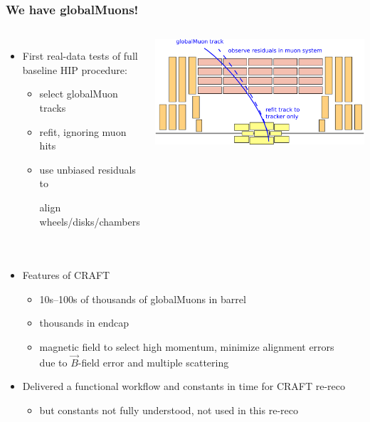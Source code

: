 \documentclass[compress]{beamer}
\begin{document}
\begin{frame}
\frametitle{We have globalMuons!}

\begin{columns}
\begin{itemize}
\item First real-data tests of full baseline HIP procedure:
\begin{itemize}\setlength{\itemsep}{0.05 cm}
\item select globalMuon tracks
\item refit, ignoring muon hits
\item use unbiased residuals to

\mbox{\hspace{-0.5 cm}align} wheels/disks/chambers
\end{itemize}
\end{itemize}

\includegraphics[width=\linewidth]{globalMuons.png}
\end{columns}

\begin{columns}
\begin{itemize}\setlength{\itemsep}{0.35 cm}
\item Features of CRAFT
\begin{itemize}\setlength{\itemsep}{0.05 cm}
\item 10s--100s of thousands of globalMuons in barrel
\item thousands in endcap
\item magnetic field to select high momentum, minimize alignment errors \\ due to $\vec{B}$-field error and multiple scattering
\end{itemize}

\item Delivered a functional workflow and constants in time for CRAFT re-reco
\begin{itemize}
\item but constants not fully understood, not used in this re-reco
\end{itemize}
\end{itemize}
\end{columns}
\end{frame}
\end{document}
